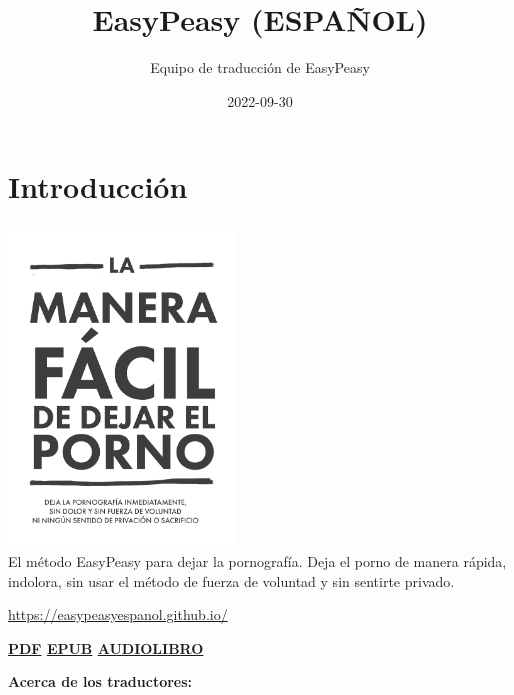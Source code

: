 \documentclass[
  spanish,
  openany]{book}
\title{EasyPeasy (ESPAÑOL)}
\author{Equipo de traducción de EasyPeasy}
\date{2022-09-30}
\let\oldurl\url
\renewcommand\url{\renewcommand\UrlFont{\ttfamily\color{linkcolor}}\oldurl}
\let\oldhref\href
\renewcommand{\href}[2]{\textcolor{linkcolor}{\oldhref{#1}{#2}}}
\begin{document}
\maketitle

{
\setcounter{tocdepth}{1}
\tableofcontents
}
\hypertarget{introduccion}{%
\chapter{Introducción}\label{introduccion}}

\includegraphics[width=0.45\textwidth,height=0.45\textheight]{img-cover.png}\\

El método EasyPeasy para dejar la pornografía. Deja el porno de manera rápida, indolora, sin usar el método de fuerza de voluntad y sin sentirte privado.

\url{https://easypeasyespanol.github.io/}

{\textbf{\href{https://easypeasyespanol.github.io/easypeasyespanol.pdf}{PDF} \textbar{} \href{https://easypeasyespanol.github.io/easypeasyespanol.epub}{EPUB} \textbar{} \href{https://www.youtube.com/playlist?list=PLvRgPTmD1BRK2Hrh4B_lxqoDNdrMhI4MD}{AUDIOLIBRO}}}

\textbf{Acerca de los traductores:}
\end{document}
